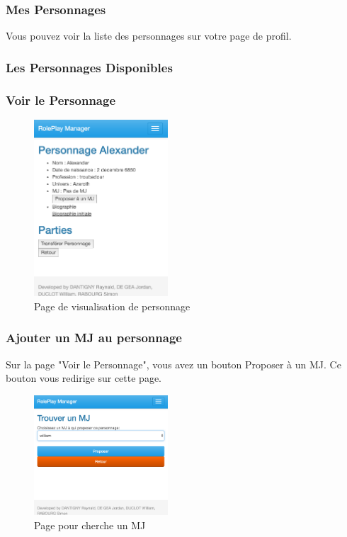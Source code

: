 \documentclass[a4paper,oneside,10pt]{article}
\begin{document}
\subsubsection{Mes Personnages}
\label{MUMesPersonnages}

Vous pouvez voir la liste des personnages sur votre page de profil. 

\subsubsection{Les Personnages Disponibles}
\label{MULesPersonnagesDisponibles}


\subsubsection{Voir le Personnage}
\label{MUVoirLePersonnage}

\begin{figure}[H]
	\begin{center}
		\includegraphics[width=5cm]{images/manuel/voirpersonnage.png}  
		\caption{Page de visualisation de personnage}
	\end{center}
\end{figure}

\subsubsection{Ajouter un MJ au personnage}
\label{MUAjouterMJPersonnage}


Sur la page "Voir le Personnage", vous avez un bouton Proposer à un MJ. Ce bouton vous redirige sur cette page. 

\begin{figure}[H]
	\begin{center}
		\includegraphics[width=5cm]{images/manuel/trouverMJ.png}  
		\caption{Page pour cherche un MJ}
	\end{center}
\end{figure}
\end{document}
